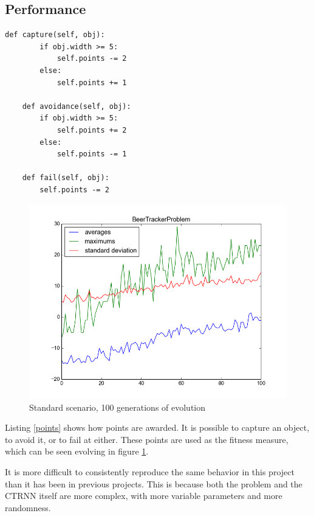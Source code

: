 \documentclass[twoside]{article}
\begin{document}
\begin{multicols}{2}
    \section{Performance}
    \begin{lstlisting}[caption=Awarding points which are used for fitness measure, label=points]
    def capture(self, obj):
        if obj.width >= 5:
            self.points -= 2
        else:
            self.points += 1

    def avoidance(self, obj):
        if obj.width >= 5:
            self.points += 2
        else:
            self.points -= 1

    def fail(self, obj):
        self.points -= 2
    \end{lstlisting}

    \begin{figure}[H]
        \centering
        \includegraphics[width=\linewidth]{images/i_like_dis_grap}
        \caption{Standard scenario, 100 generations of evolution}
        \label{standard}
    \end{figure}

    Listing \ref{points} shows how points are awarded.
    It is possible to capture an object, to avoid it, or to fail at either.
    These points are used as the fitness measure, which can be seen evolving in figure \ref{standard}.

    It is more difficult to consistently reproduce the same behavior in this project than it has been in previous projects.
    This is because both the problem and the CTRNN itself are more complex,
    with more variable parameters and more randomness.


\end{multicols}
\end{document}
